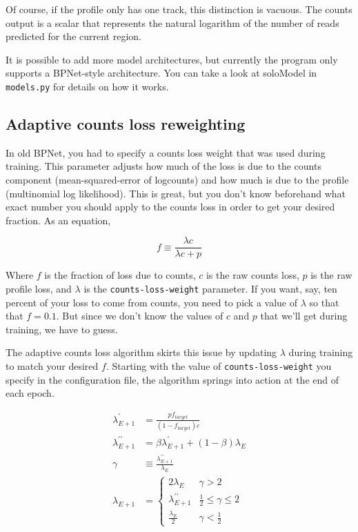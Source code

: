 \documentclass{article}
\begin{document}
Of course, if the profile only has one track, this distinction is vacuous.
The counts output is a scalar that represents the natural logarithm of the
number of reads predicted for the current region.

It is possible to add more model architectures, but currently the program only
supports a BPNet-style architecture.
You can take a look at soloModel in \texttt{models.py} for details on how it
works.

\subsection{Adaptive counts loss reweighting}\label{sec:countsLossReweighting}
In old BPNet, you had to specify a counts loss weight that was used during
training.
This parameter adjusts how much of the loss is due to the counts component
(mean-squared-error of logcounts) and how much is due to the profile
(multinomial log likelihood).
This is great, but you don't know beforehand what exact number you should apply
to the counts loss in order to get your desired fraction.
As an equation,

\begin{equation}
    f \equiv \frac{\lambda c}{\lambda c + p}
\end{equation}

Where $f$ is the fraction of loss due to counts, $c$ is the raw counts loss,
$p$ is the raw profile loss, and $\lambda$ is the \texttt{counts-loss-weight}
parameter.
If you want, say, ten percent of your loss to come from counts, you need to pick
a value of $\lambda$ so that that $f = 0.1$.
But since we don't know the values of $c$ and $p$ that we'll get during
training, we have to guess.

The adaptive counts loss algorithm skirts this issue by updating $\lambda$
during training to match your desired $f$.
Starting with the value of \texttt{counts-loss-weight} you specify in the
configuration file, the algorithm springs into action at the end of each epoch.

\begin{align}
    \lambda^\prime_{E+1} &= \frac{p f_{target}}{(1-f_{target}) c} \\
    \lambda^{\prime\prime}_{E+1} &= \beta \lambda^\prime_{E+1} + (1 - \beta) \lambda_{E} \\
    \gamma &\equiv \frac{\lambda^{\prime\prime}_{E+1}}{\lambda_E} \\
    \lambda_{E+1} &= 
    \begin{cases}
        2 \lambda_E & \gamma > 2 \\
        \lambda^{\prime\prime}_{E+1} & \frac{1}{2} \le \gamma \le 2 \\
        \frac{\lambda_E}{2} & \gamma < \frac{1}{2}
    \end{cases}
\end{align}
\end{document}
